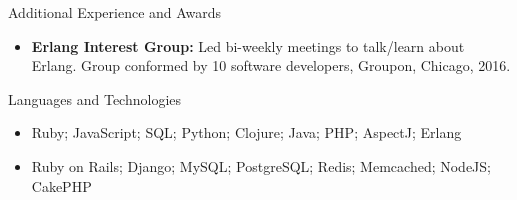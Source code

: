 \documentclass[]{mcdowellcv}
\begin{document}
	
	\begin{cvsection}{Additional Experience and Awards}
		\begin{cvsubsection}{}{}{}	
			\begin{itemize}
			        \item \textbf{Erlang Interest Group:} Led bi-weekly meetings to talk/learn about Erlang. Group conformed by 10 software developers, Groupon, Chicago, 2016.
			\end{itemize}
		\end{cvsubsection}
	\end{cvsection}
	
	\begin{cvsection}{Languages and Technologies}
		\begin{cvsubsection}{}{}{}	
			\begin{itemize}
				\item Ruby; JavaScript; SQL; Python; Clojure; Java; PHP; AspectJ; Erlang 
				\item Ruby on Rails; Django; MySQL; PostgreSQL; Redis; Memcached; NodeJS; CakePHP
			\end{itemize}
		\end{cvsubsection}
	\end{cvsection}
\end{document}
